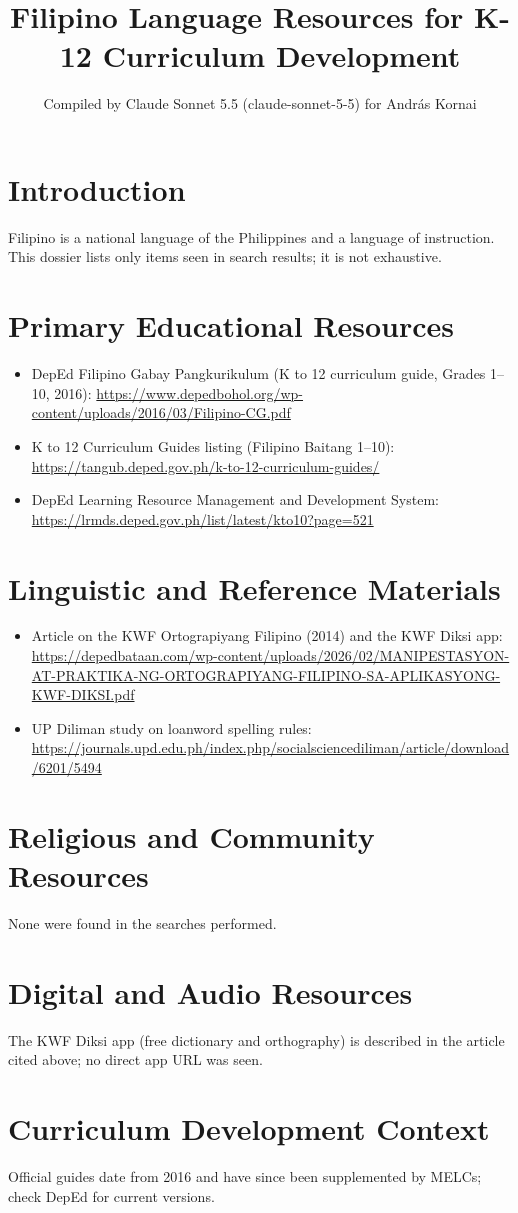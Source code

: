 \documentclass[12pt]{article}
\title{Filipino Language Resources for K-12 Curriculum Development}
\author{Compiled by Claude Sonnet 5.5 (claude-sonnet-5-5) for Andr\'as Kornai}
\date{}
\begin{document}
\maketitle
\section{Introduction}
Filipino is a national language of the Philippines and a language of instruction. This dossier lists only items seen in search results; it is not exhaustive.
\section{Primary Educational Resources}
\begin{itemize}
\item DepEd Filipino Gabay Pangkurikulum (K to 12 curriculum guide, Grades 1--10, 2016): \url{https://www.depedbohol.org/wp-content/uploads/2016/03/Filipino-CG.pdf}
\item K to 12 Curriculum Guides listing (Filipino Baitang 1--10): \url{https://tangub.deped.gov.ph/k-to-12-curriculum-guides/}
\item DepEd Learning Resource Management and Development System: \url{https://lrmds.deped.gov.ph/list/latest/kto10?page=521}
\end{itemize}
\section{Linguistic and Reference Materials}
\begin{itemize}
\item Article on the KWF Ortograpiyang Filipino (2014) and the KWF Diksi app: \url{https://depedbataan.com/wp-content/uploads/2026/02/MANIPESTASYON-AT-PRAKTIKA-NG-ORTOGRAPIYANG-FILIPINO-SA-APLIKASYONG-KWF-DIKSI.pdf}
\item UP Diliman study on loanword spelling rules: \url{https://journals.upd.edu.ph/index.php/socialsciencediliman/article/download/6201/5494}
\end{itemize}
\section{Religious and Community Resources}
None were found in the searches performed.
\section{Digital and Audio Resources}
The KWF Diksi app (free dictionary and orthography) is described in the article cited above; no direct app URL was seen.
\section{Curriculum Development Context}
Official guides date from 2016 and have since been supplemented by MELCs; check DepEd for current versions.
\end{document}
